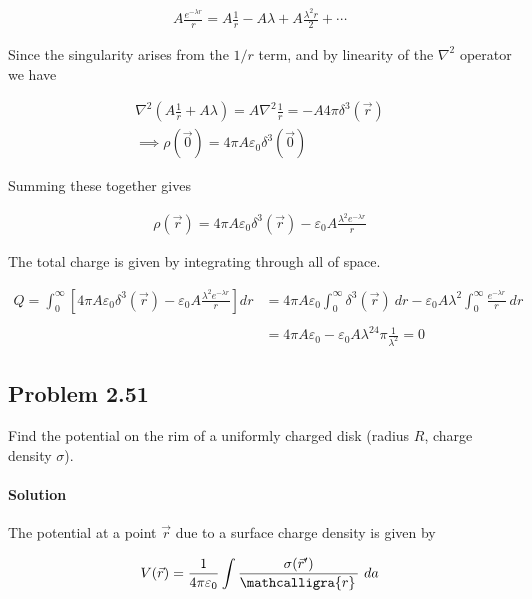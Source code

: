 \documentclass{article}
\newcommand{\scriptr}{\mathcalligra{r}\,}
\begin{document}
\begin{align*}
    A\frac{e^{-\lambda r}}{r} = A\frac{1}{r} - A\lambda + A\frac{\lambda^2 r}{2} + \cdots
\end{align*}

Since the singularity arises from the $1/r$ term, and by linearity of the $\nabla^2$ operator we have 

\begin{align*}
    \nabla^2 (A\frac{1}{r} + A\lambda ) = A\nabla^2 \frac{1}{r} = -A4\pi \delta^3(\vec{r})  \\
    \implies \rho(\vec{0}) = 4\pi A\varepsilon_0\delta^3(\vec{0})
\end{align*}

Summing these together gives 

\begin{align*}
    \rho({\vec{r}}) = 4\pi A\varepsilon_0\delta^3(\vec{r}) -\varepsilon_0A\frac{\lambda^2e^{-\lambda r}}{r} 
\end{align*}

The total charge is given by integrating through all of space. 

\begin{align*}
    Q = \int_0^{\infty} \left[4\pi A\varepsilon_0\delta^3(\vec{r}) -\varepsilon_0A\frac{\lambda^2e^{-\lambda r}}{r}\right] dr &= 4\pi A\varepsilon_0 \int_0^{\infty} \delta^3(\vec{r})\ dr -\varepsilon_0A\lambda^2 \int_0^{\infty} \frac{e^{-\lambda r}}{r}\ dr \\
    \\
    &= 4\pi A\varepsilon_0 - \varepsilon_0A\lambda^24\pi 
    \frac{1}{\lambda ^2} = 0
\end{align*}

\newpage

\subsection*{Problem 2.51}
Find the potential on the rim of a uniformly charged disk (radius $R$, charge density $\sigma$). 

\paragraph{Solution} The potential at a point $\vec{r}$ due to a surface charge density is given by 

\begin{align*}
    V(\vec{r}) = \frac{1}{4\pi\varepsilon_0}\int \frac{\sigma(\vec{r}')}{\scriptr}\ da
\end{align*}
\end{document}
